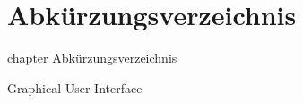 
%

\chapter*{Abkürzungsverzeichnis}
   {chapter} {Abkürzungsverzeichnis}

\begin{acronym} [XXXXX]








 {Graphical User Interface}




















\end{acronym}
